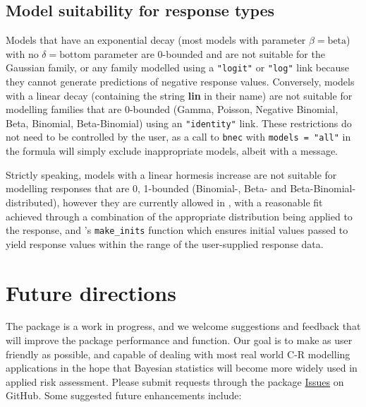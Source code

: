 \documentclass[
  shortnames]{jss}
\begin{document}
\hypertarget{model-suitability-for-response-types}{%
\subsection{Model suitability for response types}\label{model-suitability-for-response-types}}

Models that have an exponential decay (most models with parameter \(\beta = \text{beta}\)) with no \(\delta = \text{bottom}\) parameter are 0-bounded and are not suitable for the Gaussian family, or any family modelled using a \texttt{"logit"} or \texttt{"log"} link because they cannot generate predictions of negative response values. Conversely, models with a linear decay (containing the string \textbf{lin} in their name) are not suitable for modelling families that are 0-bounded (Gamma, Poisson, Negative Binomial, Beta, Binomial, Beta-Binomial) using an \texttt{"identity"} link. These restrictions do not need to be controlled by the user, as a call to \texttt{bnec} with \texttt{models\ =\ "all"} in the formula will simply exclude inappropriate models, albeit with a message.

Strictly speaking, models with a linear hormesis increase are not suitable for modelling responses that are 0, 1-bounded (Binomial-, Beta- and Beta-Binomial-distributed), however they are currently allowed in , with a reasonable fit achieved through a combination of the appropriate distribution being applied to the response, and 's \texttt{make\_inits} function which ensures initial values passed to  yield response values within the range of the user-supplied response data.

\hypertarget{future-directions}{%
\section{Future directions}\label{future-directions}}

The  package is a work in progress, and we welcome suggestions and feedback that will improve the package performance and function. Our goal is to make  as user friendly as possible, and capable of dealing with most real world C-R modelling applications in the hope that Bayesian statistics will become more widely used in applied risk assessment. Please submit requests through the package \href{https://github.com/open-AIMS/bayesnec/issues}{Issues} on GitHub. Some suggested future enhancements include:
\end{document}
